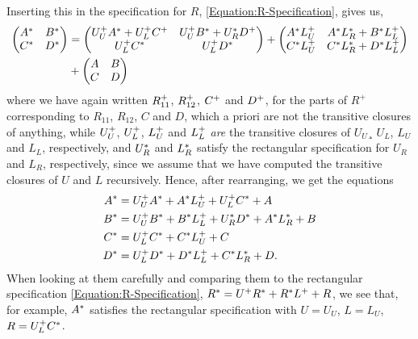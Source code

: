 Inserting this in the specification for $R$, \eqref{Equation:R-Specification}, gives us,
\begin{align*}
  \begin{pmatrix}
    A^* & B^* \\
    C^* & D^*
  \end{pmatrix} &= 
  \begin{pmatrix}
    U_U^+A^* + U_L^+C^+  &  U_U^+B^* + U_R^*D^+ \\
    U_L^+C^*                   &  U_L^+D^*
  \end{pmatrix}
  +
  \begin{pmatrix}
    A^*L_U^+        &   A^*L_R^* + B^*L_L^+\\
    C^*L_U^+        &   C^*L_R^* + D^*L_L^+
  \end{pmatrix}
  \\&+
  \begin{pmatrix}
    A & B \\
    C & D
  \end{pmatrix}
\end{align*}
where we have again written $R_{11}^+$, $R_{12}^+$, $C^+$ and $D^+$, for the parts of $R^+$ corresponding to $R_{11}$, $R_{12}$, $C$ and $D$, which a priori are not the transitive closures of anything, while $U_U^+$, $U_L^+$, $L_U^+$ and $L_L^+$ \emph{are} the transitive closures of $U_U$¸ $U_L$, $L_U$ and $L_L$, respectively, and $U_R^*$ and $L_R^*$ satisfy the rectangular specification for $U_R$ and $L_R$, respectively, since we assume that we have computed the transitive closures of $U$ and $L$ recursively.
Hence, after rearranging, we get the equations
\begin{align*}
  A^* &= U_U^+A^* + A^*L_U^+ + U_L^+C^* + A \\
  B^* &= U_U^+B^* + B^*L_L^+ + U_R^*D^* + A^*L_R^* + B \\
  C^* &= U_L^+C^* + C^*L_U^+ + C\\
  D^* &= U_L^+D^* + D^*L_L^+ + C^*L_R^* +  D.
\end{align*}
When looking at them carefully and comparing them to the rectangular specification \eqref{Equation:R-Specification}, $R^* = U^+R^* + R^*L^+ + R$, we see that, for example, $A^*$ satisfies the rectangular specification with $U = U_U$, $L = L_U$, $R = U_L^+C^*$.

